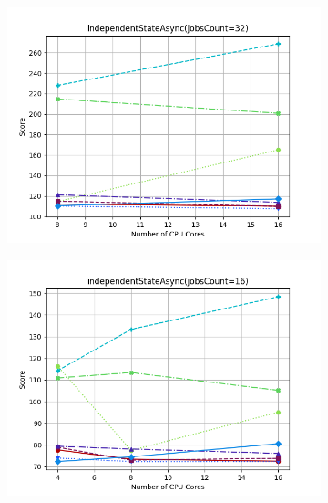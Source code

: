 \documentclass{article}
\begin{document}
\begin{figure}[H]
    \centering
    \begin{subfigure}[b]{0.48\textwidth}
        \includegraphics[width=\linewidth]{plots/independentStateAsync(jobsCount=32).png}
    \end{subfigure}
    \begin{subfigure}[b]{0.48\textwidth}
        \includegraphics[width=\linewidth]{plots/independentStateAsync(jobsCount=16).png}
    \end{subfigure}

    \vspace{1em}


\end{figure}
\end{document}
